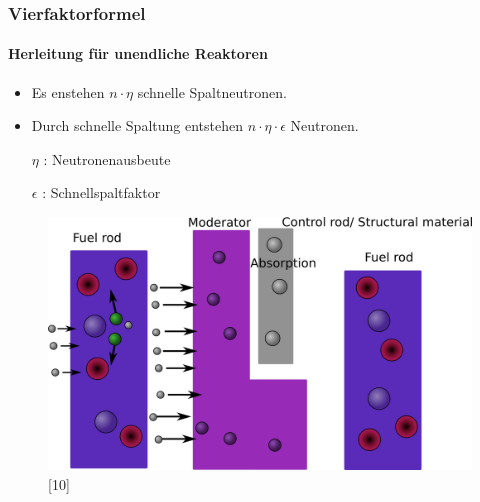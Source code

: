 \documentclass{beamer}[9pt]
\begin{document}
\begin{frame}
\frametitle{Vierfaktorformel}
\framesubtitle{Herleitung für unendliche Reaktoren}
\begin{itemize}
\item Es enstehen $n\cdot\eta$ schnelle Spaltneutronen.
\item Durch schnelle Spaltung entstehen $n\cdot\eta\cdot\epsilon$ Neutronen.
\item[$\eta$ :]Neutronenausbeute
\item[$\epsilon$ :]Schnellspaltfaktor
\end{itemize}

\begin{figure}
\centering
\includegraphics[scale=.15]{thermal_reactor_2.png}[10]
\end{figure}
\end{frame}
\end{document}
